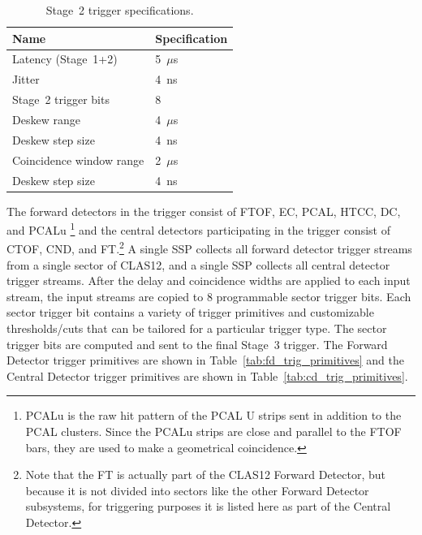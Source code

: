 \begin{table}
\begin{center}
	\begin{tabular}{| l | l |}
		\hline \hline
		Name				& Specification	\\
		\hline
		Latency (Stage~1+2)		& 5~$\mu$s	\\
		Jitter				& 4~ns		\\
		Stage~2 trigger bits		& 8		\\
		Deskew range			& 4~$\mu$s	\\
		Deskew step size		& 4~ns	\\
		Coincidence window range	& 2~$\mu$s	\\
		Deskew step size		& 4~ns	\\
		\hline \hline
	\end{tabular}
\end{center}
\caption{Stage~2 trigger specifications.}
\label{tab:stage_2_specs}
\end{table}

The forward detectors in the trigger consist of FTOF, EC, PCAL, HTCC, DC, and PCALu \footnote{PCALu is the
  raw hit pattern of the PCAL U strips sent in addition to the PCAL clusters. Since the PCALu strips are close
  and parallel to the FTOF bars, they are used to make a geometrical coincidence.} and the central detectors
participating in the trigger consist of CTOF, CND, and FT.\footnote{Note that the FT is actually part of the
  CLAS12 Forward Detector, but because it is not divided into sectors like the other Forward Detector
  subsystems, for triggering purposes it is listed here as part of the Central Detector.} A single SSP collects
all forward detector trigger streams from a single sector of CLAS12, and a single SSP collects all central
detector trigger streams. After the delay and coincidence widths are applied to each input stream, the input
streams are copied to 8 programmable sector trigger bits. Each sector trigger bit contains a variety of trigger
primitives and customizable thresholds/cuts that can be tailored for a particular trigger type. The sector
trigger bits are computed and sent to the final Stage~3 trigger. The Forward Detector trigger primitives are
shown in Table~\ref{tab:fd_trig_primitives} and the Central Detector trigger primitives are shown in
Table~\ref{tab:cd_trig_primitives}.

